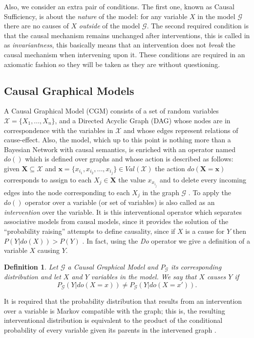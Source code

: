 \documentclass[review]{elsarticle}
\newtheorem{definition}[theorem]{Definition}
\begin{document}
Also, we consider an extra pair of conditions. The first one, known as Causal Sufficiency, is about the \textit{nature} of the model: for any variable $X$ in the model $\mathcal{G}$ there are no causes of $X$ \textit{outside} of the model $\mathcal{G}$\citep{spirtes2000causation,pearl2009causality,sucar2015probabilistic}. The second required condition is that the causal mechanism remains unchanged after interventions, this is called in \citep{woodward2005making} as \textit{invariantness}, this basically means that an intervention does not \textit{break} the causal mechanism when intervening upon it. These conditions are required in an axiomatic fashion so they will be taken as they are without questioning.

\subsection{Causal Graphical Models}
A Causal Graphical Model (CGM) \citep{koller2009probabilistic,sucar2015probabilistic} consists of a set of random variables $\mathcal{X}=\{ X_1,...,X_n \}$, and a Directed Acyclic Graph (DAG) whose nodes are in correspondence with the variables in $\mathcal{X}$ and whose edges represent relations of cause-effect. Also, the model, which up to this point is nothing more than a Bayesian Network with causal semantics, is enriched with an operator named $do()$ which is defined over graphs and whose action is described as follows: given $\mathbf{X} \subseteq \mathcal{X}$ and $\mathbf{x} = \{ x_{i_1}, x_{i_2}, ... , x_{i_j} \} \in Val(\mathcal{X})$ the action $do(\mathbf{X} = \mathbf{x} )$ corresponds to assign to each $X_j \in \mathbf{X}$ the value $x_{x_{i_j}}$ and to delete every incoming edges into the node corresponding to each $X_j$ in the graph $\mathcal{G}$ \citep{pearl2009causality,koller2009probabilistic,sucar2015probabilistic}. To apply the $do()$ operator over a variable (or set of variables) is also called as an \textit{intervention} over the variable. It is this interventional operator which separates associative models from causal models, since it provides the solution of the “probability raising” attempts to define causality, since if $X$ is a cause for $Y$ then $P(Y | do(X)) > P(Y)$ \citep{pearl2018why}. In fact, using the \textit{Do} operator we give a definition of a variable $X$ causing $Y$.
\begin{definition}
Let $\mathcal{G}$ a Causal Graphical Model and $P_\mathcal{G}$ its corresponding distribution and let $X$ and $Y$ variables in the model. We say that $X$ \textit{causes} $Y$ if 
\[ P_\mathcal{G}(Y | do(X=x)) \neq P_\mathcal{G}(Y | do(X=x')). \]
\end{definition}
It is required that the probability distribution that results from an intervention over a variable is Markov compatible with the graph; this is, the resulting interventional distribution is equivalent to the product of the conditional probability of every variable given its parents in the intervened graph \citep{sucar2015probabilistic}.
\end{document}
